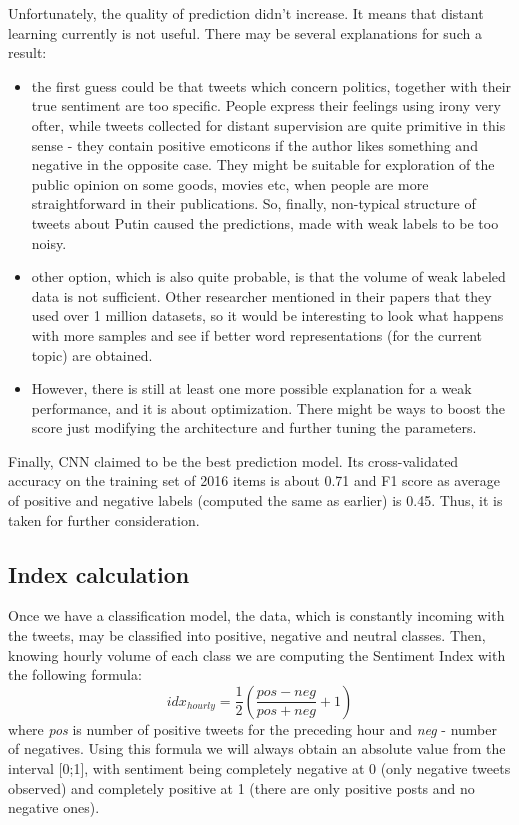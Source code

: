 \documentclass[12pt,a4paper]{article}
\begin{document}
Unfortunately, the quality of prediction didn't increase. It means that distant learning currently is not useful. There may be several explanations for such a result:
\begin{itemize}
\item  the first guess could be that tweets which concern politics, together with their true sentiment are too specific. People express their feelings using irony very ofter, while tweets collected for distant supervision are quite primitive in this sense - they contain positive emoticons if the author likes something and negative in the opposite case. They might be suitable for exploration of the public opinion on some goods, movies etc, when people are more straightforward in their publications. So, finally, non-typical structure of tweets about Putin caused the predictions, made with weak labels to be too noisy.
\item other option, which is also quite probable, is that the volume of weak labeled data is not sufficient. Other researcher mentioned in their papers that they used over 1 million datasets, so it would be interesting to look what happens with more samples and see if better word representations (for the current topic) are obtained.
\item However, there is still at least one more possible explanation for a weak performance, and it is about optimization. There might be ways to boost the score just modifying the architecture and further tuning the parameters.
\end{itemize}

Finally, CNN claimed to be the best prediction model. Its cross-validated accuracy on the training set of 2016 items is about 0.71 and F1 score as average of positive and negative labels (computed the same as earlier) is 0.45. Thus, it is taken for further consideration.

\subsection{Index calculation}
Once we have a classification model, the data, which is constantly incoming with the tweets, may be classified into positive, negative and neutral classes. Then, knowing hourly volume of each class we are computing the Sentiment Index with the following formula: 
\[idx_{hourly} = \frac{1}{2} (\frac{pos - neg}{pos + neg} +  1) \] where \textit{pos} is number of positive tweets for the preceding hour and \textit{neg} - number of negatives. 
Using this formula we will always obtain an absolute value from the interval [0;1], with sentiment being completely negative at 0 (only negative tweets observed) and completely positive at 1 (there are only positive posts and no negative ones).
\end{document}
